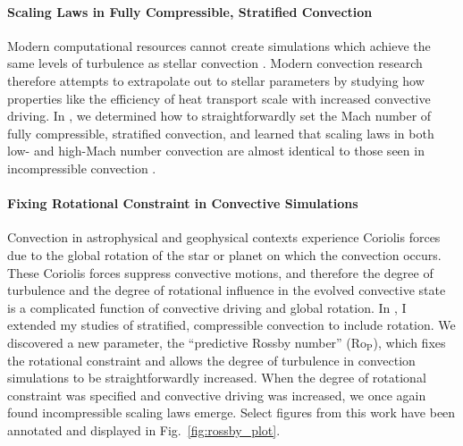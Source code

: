 \documentclass[preprint, hmargin=1in, vmargin=1in]{aastex62}
\begin{document}
\thispagestyle{fancy}
\paragraph{Scaling Laws in Fully Compressible, Stratified Convection}
Modern computational resources cannot create simulations which achieve the same levels of turbulence as stellar convection \citep{brummell&all2002}.
Modern convection research therefore attempts to extrapolate out to stellar parameters by studying how properties like the efficiency of heat transport scale with increased convective driving.
In \citet{anders&brown2017}, we determined how to straightforwardly set the Mach number of fully compressible, stratified convection, and learned that scaling laws in both low- and high-Mach number convection are almost identical to those seen in incompressible convection \citep{ahlers&all2009}.

\vspace{22pt}
\paragraph{Fixing Rotational Constraint in Convective Simulations}
Convection in astrophysical and geophysical contexts experience Coriolis forces due to the global rotation of the star or planet on which the convection occurs.
These Coriolis forces suppress convective motions, and therefore the degree of turbulence and the degree of rotational influence in the evolved convective state is a complicated function of convective driving and global rotation.
In \citet{anders&all2019}, I extended my studies of stratified, compressible convection to include rotation.
We discovered a new parameter, the ``predictive Rossby number'' (Ro$_\text{P}$), which fixes the rotational constraint and allows the degree of turbulence in convection simulations to be straightforwardly increased.
When the degree of rotational constraint was specified and convective driving was increased, we once again found incompressible scaling laws emerge.
Select figures from this work have been annotated and displayed in Fig.~\ref{fig:rossby_plot}.
\end{document}
